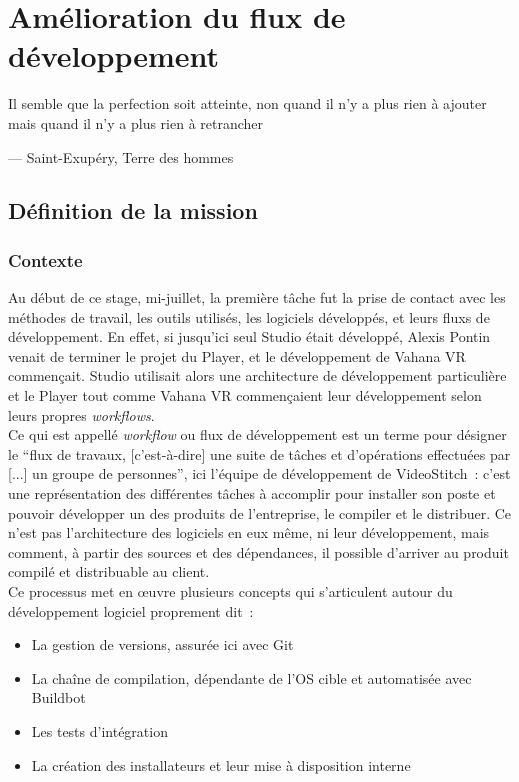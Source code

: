 \chapter{Amélioration du flux de développement}
\epigraph{Il semble que la perfection soit atteinte, non quand il n'y a plus 
rien à ajouter mais quand il n'y a plus rien à retrancher}{--- \small{\textup{Saint-Exupéry,
Terre des hommes}}}

\section{Définition de la mission}
\subsection{Contexte}
Au début de ce stage, mi-juillet, la première tâche fut la prise de contact avec 
les méthodes de travail, les outils utilisés, les logiciels développés, et leurs
fluxs de développement. En effet, si jusqu'ici seul Studio était développé, Alexis
Pontin venait de terminer le projet du Player, et le développement de Vahana
VR commençait. Studio utilisait alors une architecture de développement particulière
et le Player tout comme Vahana VR commençaient leur développement selon leurs propres
\textit{workflows}.\\
\newline
Ce qui est appellé \textit{workflow} ou flux de développement est un terme pour désigner le 
\enquote{flux de travaux, [c'est-à-dire] une suite de tâches et
d'opérations effectuées par [...] un groupe de personnes}\cite{workflow}, ici l'équipe de développement
de VideoStitch~: c'est une représentation des différentes tâches à accomplir pour installer
son poste et pouvoir développer un des produits de l'entreprise, le compiler et le distribuer.
Ce n'est pas l'architecture des logiciels en eux même, ni leur développement,
mais comment, à partir des sources et des dépendances, il possible d'arriver au produit
compilé et distribuable au client.\\
Ce processus met en \oe uvre plusieurs concepts qui s'articulent autour du développement
logiciel proprement dit~:\cite{software-build}\cite{build-automation}
\begin{itemize}
  \item La gestion de versions, assurée ici avec Git\cite{gestion-versions}
  \item La chaîne de compilation, dépendante de l'OS cible et automatisée avec Buildbot \cite{chaine-compilation}\cite{integration-continue}
  \item Les tests d'intégration\cite{integration-continue}
  \item La création des installateurs et leur mise à disposition interne\\
\end{itemize}
